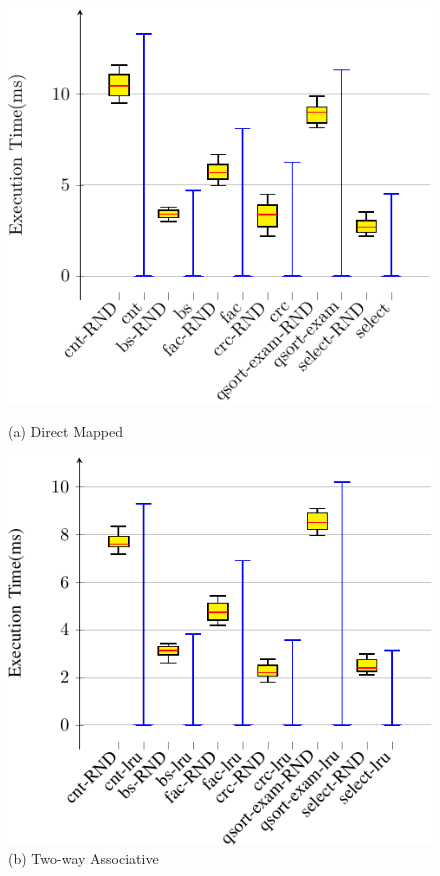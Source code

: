 \documentclass{article}
\begin{document}




 
 \begin{figure}
 \centering
 \begin{minipage}{.6\textwidth}
   \centering
   \hspace{-3cm}
   \includegraphics[width=1\linewidth]{direct_mapped.pdf}
  \hspace{-2cm} \caption*{(a) Direct Mapped}
   \label{fig:sub1}
 \end{minipage}%
 \begin{minipage}{.6\textwidth}
   \centering
   \includegraphics[width=1\linewidth]{two_way.pdf}
   \caption*{(b) Two-way Associative}
   \label{fig:sub2}
 \end{minipage}
 
 \label{fig:test}
 \end{figure}
 
\end{document}
